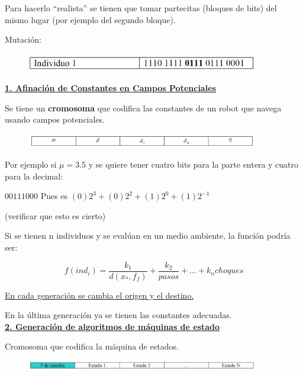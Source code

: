 Para hacerlo “realista” se tienen que tomar partecitas (bloques de bits) del mismo lugar (por ejemplo del
segundo bloque).

Mutación:

\begin{figure}[h!]
	\centering
	\includegraphics[width=0.9\textwidth]{images/img85.png}
	\label{figura85}
\end{figure}


\textbf{\underline{1. Afinación de Constantes en Campos Potenciales}}

Se tiene un \textbf{cromosoma} que codifica las constantes de un robot que navega usando campos potenciales.

\begin{figure}[h!]
	\centering
	\includegraphics[width=0.9\textwidth]{images/img86.png}
	\label{figura86}
\end{figure}

Por ejemplo si $\mu = 3.5$ y se quiere tener cuatro bits para la parte entera y cuatro para la decimal:

$0011 1000$
Pues es $(0)2^3 + (0)2^2 + (1)2^0 + (1)2^{-1}$

(verificar que esto es cierto)

Si se tienen n individuos y se evalúan en un medio ambiente, la función podría ser:

$$ f(ind_i) = \dfrac{k_1}{d(x_*,f_f)} + \dfrac{k_2}{pasos} + ... + k_n choques $$

\underline{En cada generación se cambia el origen y el destino.}

En la última generación ya se tienen las constantes adecuadas. \\


\textbf{\underline{2. Generación de algoritmos de máquinas de estado}}

Cromosoma que codifica la máquina de estados.

\begin{figure}[h!]
	\centering
	\includegraphics[width=0.9\textwidth]{images/img87.png}
	\label{figura87}
\end{figure}


